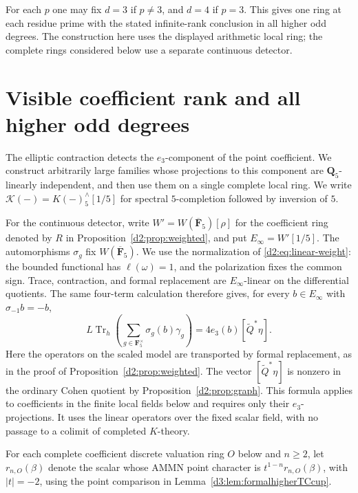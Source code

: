 For each $p$ one may fix $d=3$ if $p\ne3$, and $d=4$
if $p=3$. This gives one ring at each residue prime
with the stated infinite-rank conclusion in all higher odd
degrees. The construction here uses the displayed arithmetic local ring;
the complete rings considered below use a separate continuous detector.

\section{Visible coefficient rank and all higher odd degrees}
\label{d2ext:dimtwoVisibleHigherRank}

The elliptic contraction detects the $e_3$-component of the point
coefficient. We construct arbitrarily large families whose projections
to this component are $\mathbf Q_5$-linearly independent, and then use
them on a single complete local ring.
We write $\mathcal K(-)=K(-)^\wedge_5[1/5]$ for spectral
$5$-completion followed by inversion of $5$.

For the continuous detector, write $W'=W(\overline{\mathbf F}_5)[\rho]$
for the coefficient ring denoted by $R$ in
Proposition~\ref{d2:prop:weighted}, and put $E_\infty=W'[1/5]$.
The automorphisms $\sigma_g$ fix $W(\overline{\mathbf F}_5)$.
We use the normalization of \eqref{d2:eq:linear-weight}: the bounded
functional has $\ell(\omega)=1$, and the polarization fixes the common
sign. Trace, contraction, and formal replacement are $E_\infty$-linear
on the differential quotients. The same four-term calculation therefore
gives, for every $b\in E_\infty$ with $\sigma_{-1}b=-b$,
\[
 L\operatorname{Tr}_h\left(\sum_{g\in\mathbf F_5^\times}
                  \sigma_g(b)\gamma_g\right)
       =4e_3(b)[\widetilde Q^*\eta].
\]
Here the operators on the scaled model are transported by formal
replacement, as in the proof of Proposition~\ref{d2:prop:weighted}.
The vector $[\widetilde Q^*\eta]$ is nonzero in the ordinary Cohen
quotient by Proposition~\ref{d2:prop:graph}. This formula applies to
coefficients in the finite local fields below and requires only their
$e_3$-projections. It uses the linear operators over the fixed scalar
field, with no passage to a colimit of completed $K$-theory.

For each complete coefficient discrete valuation ring $O$ below and
$n\geq2$, let $r_{n,O}(\beta)$ denote the scalar whose AMMN point
character is $t^{1-n}r_{n,O}(\beta)$, with $|t|=-2$, using the point
comparison in Lemma~\ref{d3:lem:formalhigherTCcup}.

